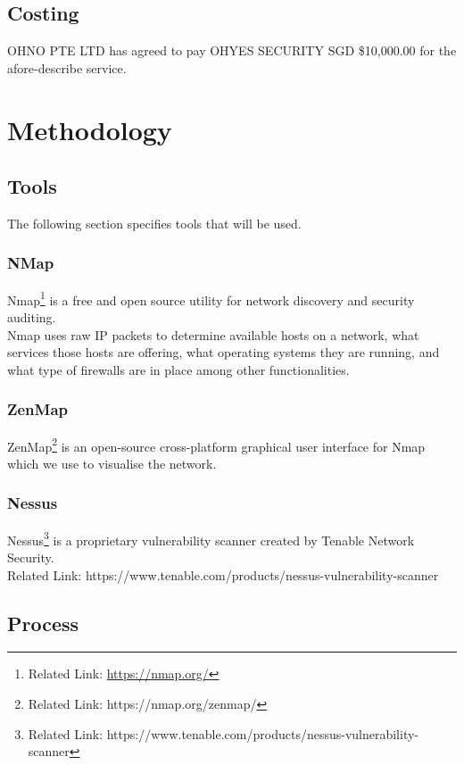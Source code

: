 \documentclass[11pt, oneside]{article}   	%
\begin{document}
\subsection{Costing}
OHNO PTE LTD has agreed to pay OHYES SECURITY SGD \$10,000.00 for the
afore-describe service.

\section{Methodology}

\subsection{Tools}
The following section specifies tools that will be used.

\subsubsection{NMap}
Nmap\footnote{Related Link: \url{https://nmap.org/}} is a free and open 
source utility for network discovery and security auditing. \\

Nmap uses raw IP packets to determine available hosts on a network, what services those
hosts are offering, what operating systems they are running, and what type of firewalls are
in place among other functionalities.


\subsubsection{ZenMap}
ZenMap\footnote{Related Link: https://nmap.org/zenmap/} is an open-source cross-platform
graphical user interface for Nmap which we use to visualise the network.

\subsubsection{Nessus}
Nessus\footnote{Related Link: https://www.tenable.com/products/nessus-vulnerability-scanner} 
is a proprietary vulnerability scanner created by Tenable Network Security. \\

Related Link: https://www.tenable.com/products/nessus-vulnerability-scanner

\subsection{Process}
\end{document}
